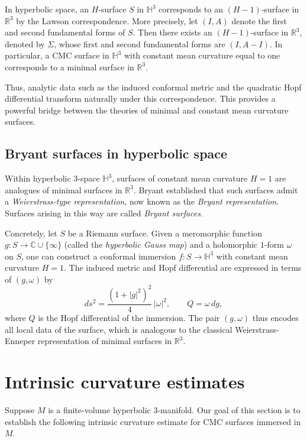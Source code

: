 \documentclass[12pt,a4paper]{amsart}
\numberwithin{equation}{section}
\theoremstyle{plain}
\theoremstyle{named}
\theoremstyle{definition}
\begin{document}
In hyperbolic space, an $H$-surface $S$ in $\mathbb{H}^3$ corresponds to an $(H-1)$-surface in $\mathbb{R}^3$ by the Lawson correspondence. More precisely, let $(I,A)$ denote the first and second fundamental forms of $S$. Then there exists an $(H-1)$-surface in $\mathbb{R}^3$, denoted by $\Sigma$, whose first and second fundamental forms are $(I,A-I)$. In particular, a CMC surface in $\mathbb{H}^3$ with constant mean curvature equal to one corresponds to a minimal surface in $\mathbb{R}^3$.


Thus, analytic data such as the induced conformal metric and the quadratic Hopf differential 
transform naturally under this correspondence. This provides a powerful bridge between the theories of minimal and constant mean curvature surfaces.

\subsection{Bryant surfaces in hyperbolic space}

Within hyperbolic $3$-space $\mathbb{H}^3$, surfaces of constant mean curvature $H=1$ 
are analogues of minimal surfaces in $\mathbb{R}^3$. Bryant \cite{Bryant} established that such surfaces admit a \emph{Weierstrass-type representation}, now known as the \emph{Bryant representation}. Surfaces arising in this way are called \emph{Bryant surfaces}. 

Concretely, let $S$ be a Riemann surface.  
Given a meromorphic function $g:S \to \mathbb{C} \cup \{\infty\}$ (called the \emph{hyperbolic Gauss map}) and a holomorphic $1$-form $\omega$ on $S$, one can construct a conformal immersion 
$f:S \to \mathbb{H}^3$ with constant mean curvature $H=1$. The induced metric and Hopf differential are expressed in terms of $(g,\omega)$ by
\[
ds^2 = \frac{(1+|g|^2)^2}{4}\,|\omega|^2, 
\qquad Q = \omega \, dg,
\]
where $Q$ is the Hopf differential of the immersion. The pair $(g,\omega)$ thus encodes all local data of the surface, which is analogous to the classical Weierstrass-Enneper representation of minimal surfaces in $\mathbb{R}^3$.  


\section{Intrinsic curvature estimates}\label{section_intrinsic_est}
Suppose $M$ is a finite-volume hyperbolic 3-manifold. Our goal of this section is to establish the following intrinsic curvature estimate for CMC surfaces immersed in $M$.
\end{document}
